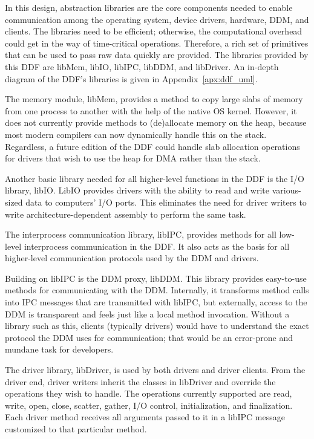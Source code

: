 
In this design, abstraction libraries are the core components needed to
enable communication among the operating system, device drivers,
hardware, DDM, and clients.  The libraries need to be
efficient; otherwise, the computational overhead could get in the
way of time-critical operations.  Therefore, a rich set of primitives that can
be used to pass raw data quickly are provided.  The libraries provided by this
DDF are {\important libMem, libIO, libIPC, libDDM}, and {\important libDriver}.
An in-depth diagram of the DDF's libraries is given in
Appendix~\ref{apx:ddf_uml}.

The memory module, {\important libMem}, provides a method to copy large slabs
of memory from one process to another with the help of the native OS kernel.
However, it does not currently provide methods to (de)allocate memory on the
heap, because most modern compilers can now dynamically handle this on the
stack.  Regardless, a future edition of the DDF could handle slab
allocation operations for drivers that wish to use the heap for DMA rather
than the stack.

Another basic library needed for all higher-level functions in the DDF
is the I/O library, {\important libIO}.  LibIO provides drivers with the
ability to read and write various-sized data to computers' I/O ports.
This eliminates the need for driver writers to write architecture-dependent
assembly to perform the same task.

The interprocess communication library, {\important libIPC}, provides
methods for all low-level interprocess communication in the DDF.
It also acts as the basis for all higher-level communication protocols used
by the DDM and drivers.

Building on libIPC is the DDM proxy, {\important libDDM}.  This library
provides easy-to-use methods for communicating with the DDM.  Internally,
it transforms method calls into IPC messages that are transmitted with
libIPC, but externally, access to the DDM is transparent and feels just like a
local method invocation.  Without a library such as this, clients
(typically drivers) would have to understand the exact protocol the DDM
uses for communication; that would be an error-prone and mundane task
for developers.

The driver library, {\important libDriver}, is used by both drivers and driver
clients.  From the driver end, driver writers inherit the classes in libDriver
and override the operations they wish to handle.  The operations currently
supported are {\important read, write, open, close, scatter, gather, I/O
control, initialization}, and {\important finalization}.  Each driver method
receives all arguments passed to it in a libIPC message customized to that
particular method.

